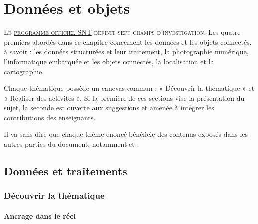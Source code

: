 \chapter[Données et objets]{Données et objets}
\label{chap:VIII}

\lettrine{L}{e \href{https://eduscol.education.fr/cid143713/snt-bac-2021.html}{programme officiel SNT} définit sept champs d'investigation}. Les \linebreak quatre premiers abordés dans ce chapitre concernent les données et les objets connectés, à savoir : les données structurées et leur traitement, la photographie numérique, l'informatique embarquée et les objets connectés, la localisation et la cartographie. 

Chaque thématique possède un canevas commun : « Découvrir la thématique » et « Réaliser des activités ». Si la première de ces sections vise la présentation du sujet, la seconde est ouverte aux suggestions et amenée à intégrer les contributions des enseignants. 

Il va sans dire que chaque thème énoncé bénéficie des contenus exposés dans les autres parties du document, notamment  et .

\section[Données et traitements]{Données et traitements}
\label{sec:.VIII.1}


\subsection[Découvrir la thématique]{Découvrir la thématique}
\label{sub:VIII.1.1}

\subsubsection[Ancrage dans le réel]{Ancrage dans le réel}
\label{subsub:VIII.1.1.1}


